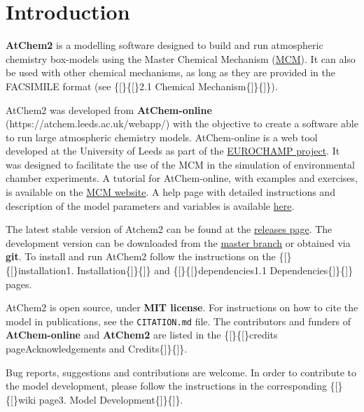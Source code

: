 \chapter{Introduction} \label{ch:introduction}

\textbf{AtChem2} is a modelling software designed to build and run
atmospheric chemistry box-models using the Master Chemical Mechanism
(\href{http://mcm.leeds.ac.uk/MCM/}{MCM}). It can also be used with
other chemical mechanisms, as long as they are provided in the FACSIMILE
format (see \{{[}\}\{{[}\}2.1 Chemical Mechanism\{{]}\}\{{]}\}).

AtChem2 was developed from \textbf{AtChem-online}
(https://atchem.leeds.ac.uk/webapp/) with the objective to create a
software able to run large atmospheric chemistry models. AtChem-online
is a web tool developed at the University of Leeds as part of the
\href{https://www.eurochamp.org/}{EUROCHAMP project}. It was designed to
facilitate the use of the MCM in the simulation of environmental chamber
experiments. A tutorial for AtChem-online, with examples and exercises,
is available on the
\href{http://mcm.leeds.ac.uk/MCMv3.3.1/atchem/tutorial_intro.htt}{MCM
website}. A help page with detailed instructions and description of the
model parameters and variables is available
\href{https://atchem.leeds.ac.uk/webapp/run/help.html}{here}.

The latest stable version of Atchem2 can be found at the
\href{https://github.com/AtChem/AtChem2/releases}{releases page}. The
development version can be downloaded from the
\href{https://github.com/AtChem/AtChem2/archive/master.zip}{master
branch} or obtained via \textbf{git}. To install and run AtChem2 follow
the instructions on the \{{[}\}\{{[}\}installation\textbar{}1.
Installation\{{]}\}\{{]}\} and \{{[}\}\{{[}\}dependencies\textbar{}1.1
Dependencies\{{]}\}\{{]}\} pages.

AtChem2 is open source, under \textbf{MIT license}. For instructions on
how to cite the model in publications, see the \texttt{CITATION.md}
file. The contributors and funders of \textbf{AtChem-online} and
\textbf{AtChem2} are listed in the \{{[}\}\{{[}\}credits
page\textbar{}Acknowledgements and Credits\{{]}\}\{{]}\}.

Bug reports, suggestions and contributions are welcome. In order to
contribute to the model development, please follow the instructions in
the corresponding \{{[}\}\{{[}\}wiki page\textbar{}3. Model
Development\{{]}\}\{{]}\}.
